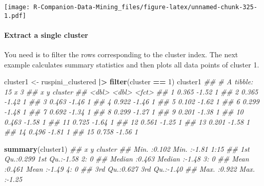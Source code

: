 \documentclass[
  notitlepage]{book}
\newenvironment{Shaded}{\begin{snugshade}}{\end{snugshade}}
\newcommand{\CommentTok}[1]{\textcolor[rgb]{0.56,0.35,0.01}{\textit{#1}}}
\newcommand{\DecValTok}[1]{\textcolor[rgb]{0.00,0.00,0.81}{#1}}
\newcommand{\ErrorTok}[1]{\textcolor[rgb]{0.64,0.00,0.00}{\textbf{#1}}}
\newcommand{\KeywordTok}[1]{\textcolor[rgb]{0.13,0.29,0.53}{\textbf{#1}}}
\newcommand{\NormalTok}[1]{#1}
\newcommand{\OperatorTok}[1]{\textcolor[rgb]{0.81,0.36,0.00}{\textbf{#1}}}
\newcommand{\StringTok}[1]{\textcolor[rgb]{0.31,0.60,0.02}{#1}}
\begin{document}
\texttt{[image: R-Companion-Data-Mining\_files/figure-latex/unnamed-chunk-325-1.pdf]}

\hypertarget{extract-a-single-cluster}{%
\paragraph{Extract a single cluster}\label{extract-a-single-cluster}}

You need is to filter the rows corresponding to the cluster index. The
next example calculates summary statistics and then plots all data
points of cluster 1.

\begin{Shaded}
\begin{Highlighting}[]
\NormalTok{cluster1 \textless{}{-}}\StringTok{ }\NormalTok{ruspini\_clustered }\OperatorTok{|}\ErrorTok{\textgreater{}}\StringTok{ }
\StringTok{  }\KeywordTok{filter}\NormalTok{(cluster }\OperatorTok{==}\StringTok{ }\DecValTok{1}\NormalTok{)}
\NormalTok{cluster1}
\CommentTok{\#\# \# A tibble: 15 x 3}
\CommentTok{\#\#        x     y cluster}
\CommentTok{\#\#    \textless{}dbl\textgreater{} \textless{}dbl\textgreater{} \textless{}fct\textgreater{}  }
\CommentTok{\#\#  1 0.365 {-}1.52 1      }
\CommentTok{\#\#  2 0.365 {-}1.42 1      }
\CommentTok{\#\#  3 0.463 {-}1.46 1      }
\CommentTok{\#\#  4 0.922 {-}1.46 1      }
\CommentTok{\#\#  5 0.102 {-}1.62 1      }
\CommentTok{\#\#  6 0.299 {-}1.48 1      }
\CommentTok{\#\#  7 0.692 {-}1.34 1      }
\CommentTok{\#\#  8 0.299 {-}1.27 1      }
\CommentTok{\#\#  9 0.201 {-}1.38 1      }
\CommentTok{\#\# 10 0.463 {-}1.58 1      }
\CommentTok{\#\# 11 0.725 {-}1.64 1      }
\CommentTok{\#\# 12 0.561 {-}1.25 1      }
\CommentTok{\#\# 13 0.201 {-}1.58 1      }
\CommentTok{\#\# 14 0.496 {-}1.81 1      }
\CommentTok{\#\# 15 0.758 {-}1.56 1}
\end{Highlighting}
\end{Shaded}

\begin{Shaded}
\begin{Highlighting}[]
\KeywordTok{summary}\NormalTok{(cluster1)}
\CommentTok{\#\#        x               y         cluster}
\CommentTok{\#\#  Min.   :0.102   Min.   :{-}1.81   1:15   }
\CommentTok{\#\#  1st Qu.:0.299   1st Qu.:{-}1.58   2: 0   }
\CommentTok{\#\#  Median :0.463   Median :{-}1.48   3: 0   }
\CommentTok{\#\#  Mean   :0.461   Mean   :{-}1.49   4: 0   }
\CommentTok{\#\#  3rd Qu.:0.627   3rd Qu.:{-}1.40          }
\CommentTok{\#\#  Max.   :0.922   Max.   :{-}1.25}
\end{Highlighting}
\end{Shaded}
\end{document}
